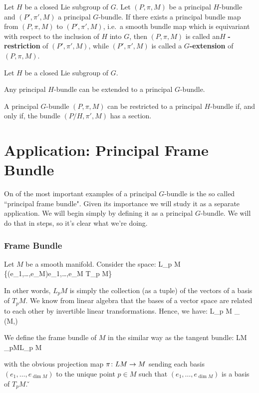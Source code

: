Let $H$ be a closed Lie subgroup of $G$. Let $(P,\pi,M)$ be a principal $H$-bundle and $(P',\pi',M)$ a principal
$G$-bundle. If there exists a principal bundle map from $(P,\pi,M)$ to $(P', \pi',M)$, i.e.\ a smooth bundle map
which is equivariant with respect to the inclusion of $H$ into $G$, then $(P,\pi, M)$ is called an$H$
\textbf{-restriction} of $(P',\pi',M)$, while $(P',\pi',M)$ is called a $G$\textbf{-extension} of $(P,\pi,M)$.
\ed

\bt[]
Let $H$ be a closed Lie subgroup of $G$.
\ben[label=\roman*)]
\item Any principal $H$-bundle can be extended to a principal $G$-bundle.
\item A principal $G$-bundle $(P,\pi,M)$ can be restricted to a principal $H$-bundle if, and only if, the bundle
$(P/H,\pi',M)$ has a section.
\een
\et

\section{Application: Principal Frame Bundle}

On of the most important examples of a principal $G$-bundle is the so called ``principal frame bundle". Given its
importance we will study it as a separate application. We will begin simply by defining it as a principal $G$-bundle.
We will do that in steps, so it's clear what we're doing.

\subsubsection*{Frame Bundle}

Let $M$ be a smooth manifold. Consider the space:
\bse
L_p M \coloneqq \{(e_1,\ldots,e_{\dim M})\mid e_1,\ldots,e_{\dim M} T_p M\}
\ese

In other words, $L_p M$ is simply the collection (as a tuple) of the vectors of a basis of $T_p M$. We know from
linear algebra that the bases of a vector space are related to each other by invertible linear transformations.
Hence, we have:
\bse
L_p M \cong_{} \GL(\dim M,\R)
\ese

We define the frame bundle of $M$ in the similar way as the tangent bundle:
\bse
LM \coloneqq \dot{\bigcup}_{p\in M}L_p M
\ese

with the obvious projection map $\pi\colon LM \to M$ sending each basis $(e_1, \ldots,e_{\dim M})$ to the unique point
$p\in M$ such that $(e_1,\ldots,e_{\dim M})$ is a basis of $T_p M$. \v

